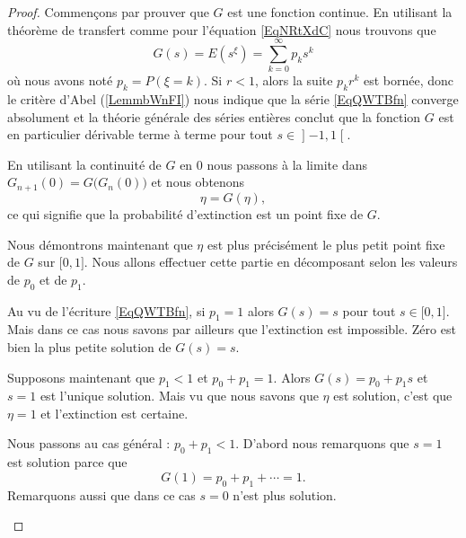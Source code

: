 \begin{proof}
    Commençons par prouver que \( G\) est une fonction continue. En utilisant la théorème de transfert comme pour l'équation \eqref{EqNRtXdC} nous trouvons que
    \begin{equation}    \label{EqQWTBfn}
        G(s)=E(s^{\xi})=\sum_{k=0}^{\infty}p_ks^k
    \end{equation}
    où nous avons noté \( p_k=P(\xi=k)\). Si \( r<1\), alors la suite \( p_kr^k\) est bornée, donc le critère d'Abel (\ref{LemmbWnFI}) nous indique que la série \eqref{EqQWTBfn} converge absolument et la théorie générale des séries entières conclut que la fonction \( G\) est en particulier dérivable terme à terme pour tout \( s\in\mathopen] -1 , 1 \mathclose[\). 

    \begin{subproof}

        \item[Le probabilité d'extinction est un point fixe de \( G\)]

    En utilisant la continuité de \( G\) en \( 0\) nous passons à la limite dans \( G_{n+1}(0)=G\big( G_n(0) \big)\) et nous obtenons
    \begin{equation}
        \eta=G(\eta),
    \end{equation}
    ce qui signifie que la probabilité d'extinction est un point fixe de \( G\).

        \item[\( \eta\) est le plus petit point fixe de \( G\)] 

    Nous démontrons maintenant que \( \eta\) est plus précisément le plus petit point fixe de \( G\) sur \( \mathopen[ 0 , 1 \mathclose]\). Nous allons effectuer cette partie en décomposant selon les valeurs de \( p_0\) et de \( p_1\).

    Au vu de l'écriture \eqref{EqQWTBfn}, si \( p_1=1\) alors \( G(s)=s\) pour tout \( s\in\mathopen[ 0 , 1 \mathclose]\). Mais dans ce cas nous savons par ailleurs que l'extinction est impossible.  Zéro est bien la plus petite solution de \( G(s)=s\).

    Supposons maintenant que \( p_1<1\) et \( p_0+p_1=1\). Alors \( G(s)=p_0+p_1s\) et \( s=1\) est l'unique solution. Mais vu que nous savons que \( \eta\) est solution, c'est que \( \eta=1\) et l'extinction est certaine. 

    Nous passons au cas général : \( p_0+p_1<1\). D'abord nous remarquons que \( s=1\) est solution parce que 
    \begin{equation}
        G(1)=p_0+p_1+\cdots=1.
    \end{equation}
    Remarquons aussi que dans ce cas \( s=0\) n'est plus solution.


\end{subproof}
\end{proof}
